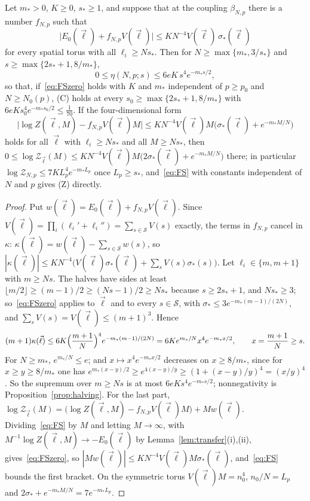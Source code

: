 \begin{proposition}\label{prop:FSC}
Let $m_*>0$, $K\ge0$, $s_*\ge1$, and suppose that at the coupling
$\beta_{N,p}$ there is a number $f_{N,p}$ such that
\begin{equation}\label{eq:FSzero}
\bigl|E_0(\vec\ell)+f_{N,p}V(\vec\ell)\bigr|\le KN^{-4}V(\vec\ell)\,
\sigma_*(\vec\ell)
\end{equation}
for every spatial torus with all $\ell_i\ge Ns_*$. Then for $N\ge\max\{m_*,
3/s_*\}$ and $s\ge\max\{2s_*+1,8/m_*\}$,
\[
0\le\eta(N,p;s)\le6eK\,s^4e^{-m_*s/2},
\]
so that, if~\eqref{eq:FSzero} holds with $K$ and $m_*$ independent of $p\ge
p_0$ and $N\ge N_0(p)$, \textup{(C)} holds at every $s_0\ge\max\{2s_*+1,
8/m_*\}$ with $6eKs_0^4e^{-m_*s_0/2}\le\frac1{70}$. If the four-dimensional
form
\begin{equation}\label{eq:FS}
\bigl|\log Z(\vec\ell,M)-f_{N,p}V(\vec\ell)M\bigr|\le KN^{-4}V(\vec\ell)M
\bigl(\sigma_*(\vec\ell)+e^{-m_*M/N}\bigr)
\end{equation}
holds for all $\vec\ell$ with $\ell_i\ge Ns_*$ and all $M\ge Ns_*$, then
$0\le\log\mathcal Z_{\vec\ell}(M)\le KN^{-4}V(\vec\ell)M\bigl(2\sigma_*(\vec
\ell)+e^{-m_*M/N}\bigr)$ there; in particular $\log\mathcal Z_{N,p}\le7KL_p^4
e^{-m_*L_p}$ once $L_p\ge s_*$, and~\eqref{eq:FS} with constants independent
of $N$ and $p$ gives \textup{(Z)} directly.
\end{proposition}

\begin{proof}
Put $w(\vec\ell)=E_0(\vec\ell)+f_{N,p}V(\vec\ell)$. Since $V(\vec\ell)=
\prod_i(\ell_i'+\ell_i'')=\sum_{s\in\mathcal S}V(s)$ exactly, the terms in
$f_{N,p}$ cancel in $\kappa$: $\kappa(\vec\ell)=w(\vec\ell)-\sum_{s\in
\mathcal S}w(s)$, so $|\kappa(\vec\ell)|\le KN^{-4}\bigl(V(\vec\ell)\sigma_*
(\vec\ell)+\sum_sV(s)\sigma_*(s)\bigr)$. Let $\ell_i\in\{m,m+1\}$ with $m\ge
Ns$. The halves have sides at least $\lfloor m/2\rfloor\ge(m-1)/2\ge(Ns-1)/2
\ge Ns_*$ because $s\ge2s_*+1$, and $Ns_*\ge3$; so~\eqref{eq:FSzero} applies
to $\vec\ell$ and to every $s\in\mathcal S$, with $\sigma_*\le3e^{-m_*(m-1)/
(2N)}$, and $\sum_sV(s)=V(\vec\ell)\le(m+1)^3$. Hence
\[
(m+1)\kappa(\vec\ell)\le6K\Bigl(\frac{m+1}N\Bigr)^4e^{-m_*(m-1)/(2N)}=
6Ke^{m_*/N}x^4e^{-m_*x/2},\qquad x=\frac{m+1}N\ge s .
\]
For $N\ge m_*$, $e^{m_*/N}\le e$; and $x\mapsto x^4e^{-m_*x/2}$ decreases on
$x\ge8/m_*$, since for $x\ge y\ge8/m_*$ one has $e^{m_*(x-y)/2}\ge e^{4(x-y)/
y}\ge(1+(x-y)/y)^4=(x/y)^4$. So the supremum over $m\ge Ns$ is at most $6eK
s^4e^{-m_*s/2}$; nonnegativity is Proposition~\ref{prop:halving}. For the
last part, $\log\mathcal Z_{\vec\ell}(M)=\bigl(\log Z(\vec\ell,M)-f_{N,p}V(
\vec\ell)M\bigr)+Mw(\vec\ell)$. Dividing~\eqref{eq:FS} by $M$ and letting
$M\to\infty$, with $M^{-1}\log Z(\vec\ell,M)\to-E_0(\vec\ell)$ by
Lemma~\ref{lem:transfer}(i),(ii), gives~\eqref{eq:FSzero}, so $|Mw(\vec\ell)|
\le KN^{-4}V(\vec\ell)M\sigma_*(\vec\ell)$, and~\eqref{eq:FS} bounds the
first bracket. On the symmetric torus $V(\vec\ell)M=n_0^4$, $n_0/N=L_p$ and
$2\sigma_*+e^{-m_*M/N}=7e^{-m_*L_p}$.
\end{proof}

